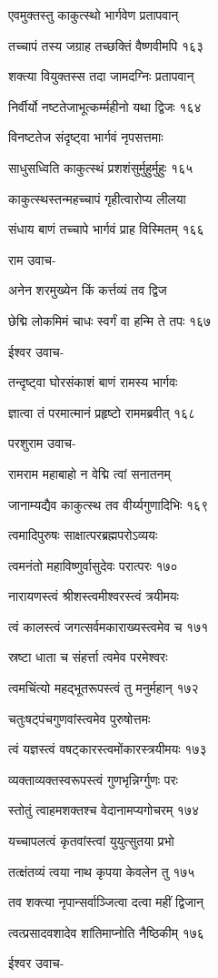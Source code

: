 एवमुक्तस्तु काकुत्स्थो भार्गवेण प्रतापवान्

तच्चापं तस्य जग्राह तच्छक्तिं वैष्णवीमपि १६३

शक्त्या वियुक्तस्स तदा जामदग्निः प्रतापवान्

निर्वीर्यो नष्टतेजाभूत्कर्म्महीनो यथा द्विजः १६४

विनष्टतेज संदृष्ट्वा भार्गवं नृपसत्तमाः

साधुसध्विति काकुत्स्थं प्रशशंसुर्मुहुर्मुहुः १६५

काकुत्स्थस्तन्महच्चापं गृहीत्वारोप्य लीलया

संधाय बाणं तच्चापे भार्गवं प्राह विस्मितम् १६६

राम उवाच-

अनेन शरमुख्येन किं कर्त्तव्यं तव द्विज

छेद्मि लोकमिमं चाधः स्वर्गं वा हन्मि ते तपः १६७

ईश्वर उवाच-

तन्दृष्ट्वा घोरसंकाशं बाणं रामस्य भार्गवः

ज्ञात्वा तं परमात्मानं प्रहृष्टो राममब्रवीत् १६८

परशुराम उवाच-

रामराम महाबाहो न वेद्मि त्वां सनातनम्

जानाम्यद्यैव काकुत्स्थ तव वीर्य्यगुणादिभिः १६९

त्वमादिपुरुषः साक्षात्परब्रह्मपरोऽव्ययः

त्वमनंतो महाविष्णुर्वासुदेवः परात्परः १७०

नारायणस्त्वं श्रीशस्त्वमीश्वरस्त्वं त्रयीमयः

त्वं कालस्त्वं जगत्सर्वमकाराख्यस्त्वमेव च १७१

स्रष्टा धाता च संहर्त्ता त्वमेव परमेश्वरः

त्वमचिंत्यो महद्भूतरूपस्त्वं तु मनुर्महान् १७२

चतुःषट्पंचगुणवांस्त्वमेव पुरुषोत्तमः

त्वं यज्ञस्त्वं वषट्कारस्त्वमोंकारस्त्रयीमयः १७३

व्यक्ताव्यक्तस्वरूपस्त्वं गुणभृन्निर्ग्गुणः परः

स्तोतुं त्वाहमशक्तश्च वेदानामप्यगोचरम् १७४

यच्चापलत्वं कृतवांस्त्वां युयुत्सुतया प्रभो

तत्क्षंतव्यं त्वया नाथ कृपया केवलेन तु १७५

तव शक्त्या नृपान्सर्वाञ्जित्वा दत्वा महीं द्विजान्

त्वत्प्रसादवशादेव शांतिमाप्नोति नैष्ठिकीम् १७६

ईश्वर उवाच-

